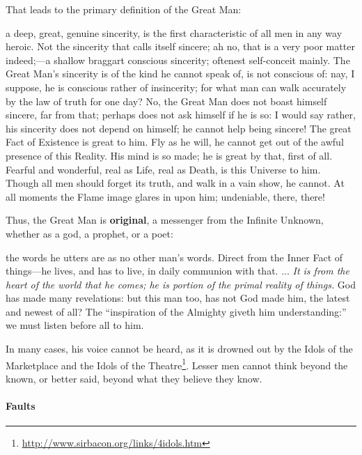 That leads to the primary definition of the Great Man:

\begin{quotex}
a deep, great, genuine sincerity, is the first characteristic of all men in any way heroic. Not the sincerity that calls itself sincere; ah no, that is a very poor matter indeed;---a shallow braggart conscious sincerity; oftenest self-conceit mainly. The Great Man's sincerity is of the kind he cannot speak of, is not conscious of: nay, I suppose, he is conscious rather of insincerity; for what man can walk accurately by the law of truth for one day? No, the Great Man does not boast himself sincere, far from that; perhaps does not ask himself if he is so: I would say rather, his sincerity does not depend on himself; he cannot help being sincere! The great Fact of Existence is great to him. Fly as he will, he cannot get out of the awful presence of this Reality. His mind is so made; he is great by that, first of all. Fearful and wonderful, real as Life, real as Death, is this Universe to him. Though all men should forget its truth, and walk in a vain show, he cannot. At all moments the Flame image glares in upon him; undeniable, there, there!
\end{quotex}


Thus, the Great Man is \textbf{original}, a messenger from the Infinite Unknown, whether as a god, a prophet, or a poet:

\begin{quotex}
the words he utters are as no other man's words. Direct from the Inner Fact of things---he lives, and has to live, in daily communion with that. ... \emph{It is from the heart of the world that he comes; he is portion of the primal reality of things.} God has made many revelations: but this man too, has not God made him, the latest and newest of all? The ``inspiration of the Almighty giveth him understanding:'' we must listen before all to him.
\end{quotex}


In many cases, his voice cannot be heard, as it is drowned out by the Idols of the Marketplace and the Idols of the Theatre\footnote{\url{http://www.sirbacon.org/links/4idols.htm}}. Lesser men cannot think beyond the known, or better said, beyond what they believe they know.

\paragraph{Faults}


